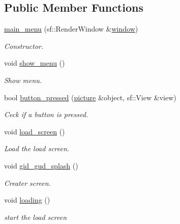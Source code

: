 \subsection*{Public Member Functions}
\begin{DoxyCompactItemize}
\item 
\hyperlink{classmain__menu_a4b0f9ffe66384d5e424a2d353371d84b}{main\+\_\+menu} (sf\+::\+Render\+Window \&\hyperlink{classmain__menu_aa3c11885ae695ba18f0b1c48cd4012c5}{window})
\begin{DoxyCompactList}\small\item\em Constructor. \end{DoxyCompactList}\item 
void \hyperlink{classmain__menu_ac653f7645e7dab1807f141ba2395dc5c}{show\+\_\+menu} ()
\begin{DoxyCompactList}\small\item\em Show menu. \end{DoxyCompactList}\item 
bool \hyperlink{classmain__menu_a9314da13b6b8a7cd40dee3d45f029835}{button\+\_\+pressed} (\hyperlink{classpicture}{picture} \&object, sf\+::\+View \&view)
\begin{DoxyCompactList}\small\item\em Ceck if a button is pressed. \end{DoxyCompactList}\item 
void \hyperlink{classmain__menu_a924f8d3f2d87b382a8590055cda2f549}{load\+\_\+screen} ()
\begin{DoxyCompactList}\small\item\em Load the load screen. \end{DoxyCompactList}\item 
void \hyperlink{classmain__menu_a555c4191cafced116939b5c6c354fe3e}{gid\+\_\+gud\+\_\+splash} ()
\begin{DoxyCompactList}\small\item\em Creater screen. \end{DoxyCompactList}\item 
void \hyperlink{classmain__menu_a83e10a5ce65747f1de76e40d32dd8e5b}{loading} ()
\begin{DoxyCompactList}\small\item\em start the load screen \end{DoxyCompactList}\end{DoxyCompactItemize}
